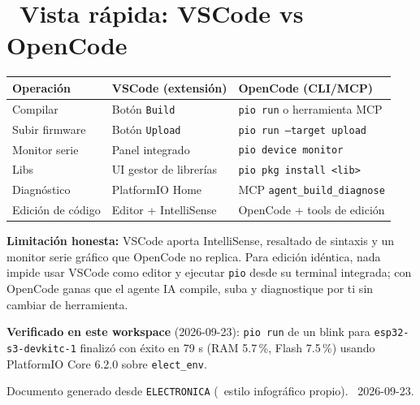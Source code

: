 \documentclass[11pt,a4paper]{article}
\newcommand{\iconotexto}[2]{\textcolor{cyanNeon}{\faIcon{#1}}~#2}
\begin{document}
\section{\iconotexto{table}{Vista r\'apida: VSCode vs OpenCode}}

\begin{tcolorbox}[tarjetaDato, title={\faIcon{arrows-alt}~Comparativa}]
\begin{tabularx}{\linewidth}{@{}p{4.2cm}XX@{}}
\toprule
\textbf{Operaci\'on} & \textbf{VSCode (extensi\'on)} & \textbf{OpenCode (CLI/MCP)} \\
\midrule
Compilar            & Bot\'on \texttt{Build}            & \texttt{pio run} \quad o herramienta MCP \\
Subir firmware      & Bot\'on \texttt{Upload}           & \texttt{pio run --target upload} \\
Monitor serie       & Panel integrado                   & \texttt{pio device monitor} \\
Libs                & UI gestor de librer\'ias          & \texttt{pio pkg install <lib>} \\
Diagn\'ostico       & PlatformIO Home                   & MCP \texttt{agent\_build\_diagnose} \\
Edici\'on de c\'odigo & Editor + IntelliSense            & OpenCode + tools de edici\'on \\
\bottomrule
\end{tabularx}
\end{tcolorbox}

\begin{tcolorbox}[cajaFortaleza]
\textbf{Limitaci\'on honesta:} VSCode aporta IntelliSense, resaltado de sintaxis y un monitor
serie gr\'afico que OpenCode no replica. Para edici\'on id\'entica, nada impide usar VSCode como
editor y ejecutar \texttt{pio} desde su terminal integrada; con OpenCode ganas que el agente IA
compile, suba y diagnostique por ti sin cambiar de herramienta.
\end{tcolorbox}

\vspace{10pt}
\begin{tcolorbox}[cajaConcepto]
\textbf{Verificado en este workspace} (2026-09-23): \texttt{pio run} de un blink para
\texttt{esp32-s3-devkitc-1} finaliz\'o con \'exito en 79 s (RAM 5.7\,\%, Flash 7.5\,\%) usando
PlatformIO Core 6.2.0 sobre \texttt{elect\_env}.
\end{tcolorbox}

\vspace{12pt}
\begin{center}
\footnotesize\color{grisTexto}
Documento generado desde \texttt{ELECTRONICA} (\textbullet\ estilo infogr\'afico propio). \textbullet\ 2026-09-23.
\end{center}
\end{document}
